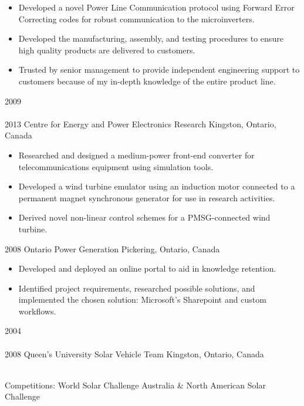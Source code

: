 \begin{entrylist}
{\begin{itemize}[leftmargin=12pt]
	\item Developed a novel Power Line Communication protocol using Forward Error Correcting codes for robust communication to the microinverters.
	\item Developed the manufacturing, assembly, and testing procedures to ensure high quality products are delivered to customers.
	\item Trusted by senior management to provide independent engineering support to customers because of my in-depth knowledge of the entire product line.
\end{itemize}
}
\entry
  {2009\\\faChevronDown\\2013}
  {Centre for Energy and Power Electronics Research}
  {Kingston, Ontario, Canada}
  {
  \begin{itemize}[leftmargin=12pt]
    \item Researched and designed a medium-power front-end converter for telecommunications equipment using simulation tools.
    \item Developed a wind turbine emulator using an induction motor connected to a permanent magnet synchronous generator for use in research activities.
    \item Derived novel non-linear control schemes for a PMSG-connected wind turbine.
  \end{itemize}}
\entry
  {2008}
  {Ontario Power Generation}
  {Pickering, Ontario, Canada}
  {
  \begin{itemize}[leftmargin=12pt]
    \item Developed and deployed an online portal to aid in knowledge retention.
    \item Identified project requirements, researched possible solutions, and implemented the chosen solution: Microsoft's Sharepoint and custom workflows.
  \end{itemize}
}
\entry
  {2004\\\faChevronDown\\2008}
  {Queen's University Solar Vehicle Team}
  {Kingston, Ontario, Canada}
  {\\
  Competitions: {\bodyfontit World Solar Challenge Australia} \&
  {\bodyfontit North American Solar Challenge}
  \begin{itemize}[leftmargin=12pt]

\end{itemize}}
\end{entrylist}
